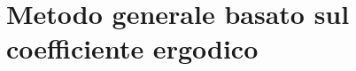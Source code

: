 \documentclass[\main/main.tex]{subfiles}
\begin{document}
\section{Metodo generale basato sul coefficiente ergodico}
\end{document}
